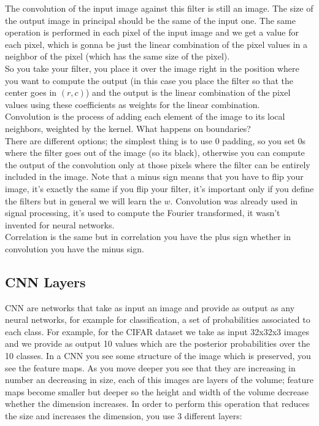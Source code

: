 The convolution of the input image against this filter is still an image. The size of the output image in principal should be the same of the input one. The same operation is performed in each pixel of the input image and we get a value for each pixel, which is gonna be just the linear combination of the pixel values in a neighbor of the pixel (which has the same size of the pixel).\\
So you take your filter, you place it over the image right in the position where you want to compute the output (in this case you place the filter so that the center goes in $(r,c)$) and the output is the linear combination of the pixel values using these coefficients as weights for the linear combination. \\
Convolution is the process of adding each element of the image to its local neighbors, weighted by the kernel. What happens on boundaries?\\
There are different options; the simplest thing is to use 0 padding, so you set 0s where the filter goes out of the image (so its black), otherwise you can compute the output of the convolution only at those pixels where the filter can be entirely included in the image. Note that a minus sign means that you have to flip your image, it's exactly the same if you flip your filter, it's important only if you define the filters but in general we will learn the $w$. Convolution was already used in signal processing, it's used to compute the Fourier transformed, it wasn't invented for neural networks. \\
Correlation is the same but in correlation you have the plus sign whether in convolution you have the minus sign. 

\subsection{CNN Layers}
CNN are networks that take as input an image and provide as output as any neural networks, for example for classification, a set of probabilities associated to each class. For example, for the CIFAR dataset we take as input 32x32x3 images and we provide as output 10 values which are the posterior probabilities over the 10 classes. In a CNN you see some structure of the image which is preserved, you see the feature maps. As you move deeper you see 
that they are increasing in number an decreasing in size, each of this images are layers of the volume; feature maps become smaller but deeper so the height and width of the volume decrease whether the dimension increases. In order to perform this operation that reduces the size and increases the dimension, you use 3 different layers: 

